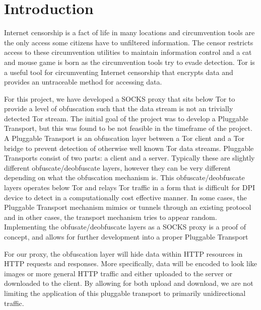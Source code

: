 \section{Introduction}
Internet censorship is a fact of life in many locations and circumvention tools are the only access some citizens have to unfiltered information. The censor restricts access to these circumvention utilities to maintain information control and a cat and mouse game is born as the circumvention tools try to evade detection. Tor is a useful tool for circumventing Internet censorship that encrypts data and provides an untraceable method for accessing data.

For this project, we have developed a SOCKS proxy that sits below Tor to provide a level of obfuscation such that the data stream is not an trivially detected Tor stream. The initial goal of the project was to develop a Pluggable Transport\cite{Ref1}, but this was found to be not feasible in the timeframe of the project. A Pluggable Transport is an obfuscation layer between a Tor client and a Tor bridge to prevent detection of otherwise  well known Tor data streams. Pluggable Transports consist of two parts: a client and a server. Typically these are slightly different obfuscate/deobfuscate layers, however they can be very different depending on what the obfuscation mechanism is. This obfuscate/deobfuscate layers operates below Tor and relays Tor traffic in a form that is difficult for DPI device to detect in a computationally cost effective manner. In some cases, the Pluggable Transport mechanism mimics or tunnels through an existing protocol\cite{Ref2,Ref3} and in other cases, the transport mechanism tries to appear random\cite{Ref4}. Implementing the obfusate/deobfuscate layers as a SOCKS proxy is a proof of concept, and allows for further development into a proper Pluggable Transport

For our proxy, the obfuscation layer will hide data within HTTP resources in HTTP requests and responses. More specifically, data will be encoded to look like images or more general HTTP traffic and either uploaded to the server or downloaded to the client. By allowing for both upload and download, we are not limiting the application of this pluggable transport to primarily unidirectional traffic. 
